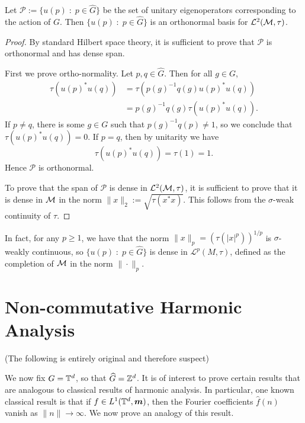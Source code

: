 \begin{proposition}
    Let $\mathcal{P} := \{u(p)\;:\;p \in \widehat{G}\}$ be the set of unitary eigenoperators
    corresponding to the action of $G$. Then $\{u(p)\;:\; p \in \widehat{G}\}$
    is an orthonormal basis for $\mathcal{L}^2(\mathcal{M},\tau)$.
\end{proposition}
\begin{proof}
    By standard Hilbert space theory, it is sufficient to prove that $\mathcal{P}$
    is orthonormal and has dense span.
    
    First we prove ortho-normality. Let $p,q \in \widehat{G}$. Then for all $g \in G$,
    \begin{align}
        \tau(u(p)^*u(q)) &= \tau(p(g)^{-1}q(g)u(p)^*u(q))\\
        &= p(g)^{-1}q(g)\tau(u(p)^*u(q)).
    \end{align}
    If $p \neq q$, there is some $g \in G$ such that $p(g)^{-1}q(p) \neq 1$,
    so we conclude that $\tau(u(p)^*u(q)) = 0$.
    If $p = q$, then by unitarity we have
    \begin{equation}
        \tau(u(p)^*u(q)) = \tau(1) = 1.
    \end{equation}
    Hence $\mathcal{P}$ is orthonormal.
    
    To prove that the span of $\mathcal{P}$ is dense in $\mathcal{L}^2(\mathcal{M},\tau)$,
    it is sufficient to prove that it is dense in $\mathcal{M}$ in the norm $\|x\|_2 := \sqrt{\tau(x^*x)}$.
    This follows from the $\sigma$-weak continuity of $\tau$.
\end{proof}

\begin{remark}
    In fact, for any $p \geq 1$, we have that the norm $\|x\|_p = (\tau(|x|^p))^{1/p}$
    is $\sigma$-weakly continuous, so $\{u(p)\;:\;p \in \widehat{G}\}$
    is dense in $\mathcal{L}^p(M,\tau)$, defined as the completion of $\mathcal{M}$
    in the norm $\|\cdot\|_p$. 
\end{remark}


\section{Non-commutative Harmonic Analysis}
(The following is entirely original and therefore suspect)

We now fix $G = \mathbb{T}^d$, so that $\widehat{G} = \mathbb{Z}^d$. It is of interest
to prove certain results that are analogous to classical results of harmonic
analysis. In particular, one known classical result is that if $f \in L^1(\mathbb{T}^d,\boldsymbol{m})$,
then the Fourier coefficients $\hat{f}(n)$ vanish as $\|n\|\rightarrow \infty$. We now
prove an analogy of this result. 

